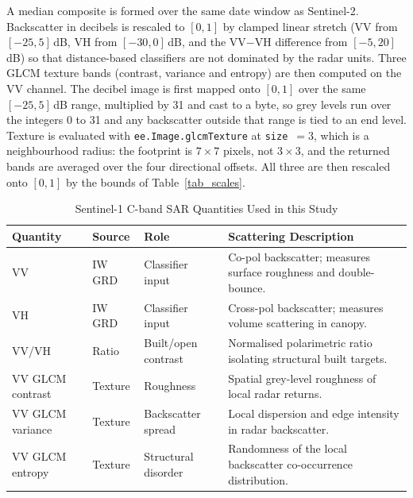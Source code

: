 \documentclass[conference]{IEEEtran}
\begin{document}
A median composite is formed over the same date window as Sentinel-2. Backscatter in decibels is rescaled to $[0,1]$ by clamped linear stretch (VV from $[-25, 5]$\,dB, VH from $[-30,0]$\,dB, and the VV$-$VH difference from $[-5,20]$\,dB) so that distance-based classifiers are not dominated by the radar units. Three GLCM texture bands (contrast, variance and entropy) are then computed on the VV channel. The decibel image is first mapped onto $[0,1]$ over the same $[-25,5]$\,dB range, multiplied by 31 and cast to a byte, so grey levels run over the integers 0 to 31 and any backscatter outside that range is tied to an end level. Texture is evaluated with \texttt{ee.Image.glcmTexture} at \texttt{size}~$=3$, which is a neighbourhood radius: the footprint is $7\times7$ pixels, not $3\times3$, and the returned bands are averaged over the four directional offsets. All three are then rescaled onto $[0,1]$ by the bounds of Table~\ref{tab_scales}.

\begin{table}[!t]
\caption{Sentinel-1 C-band SAR Quantities Used in this Study}
\label{tab_s1}
\begin{center}
\begin{tabular}{llp{4cm}p{6cm}}
\toprule
\textbf{Quantity} & \textbf{Source} & \textbf{Role} & \textbf{Scattering Description} \\
\midrule
VV                 & IW GRD & Classifier input & Co-pol backscatter; measures surface roughness and double-bounce. \\
VH                 & IW GRD & Classifier input & Cross-pol backscatter; measures volume scattering in canopy. \\
VV/VH              & Ratio  & Built/open contrast & Normalised polarimetric ratio isolating structural built targets. \\
VV GLCM contrast   & Texture & Roughness & Spatial grey-level roughness of local radar returns. \\
VV GLCM variance   & Texture & Backscatter spread & Local dispersion and edge intensity in radar backscatter. \\
VV GLCM entropy    & Texture & Structural disorder & Randomness of the local backscatter co-occurrence distribution. \\
\bottomrule
\end{tabular}
\end{center}
\end{table}
\end{document}
